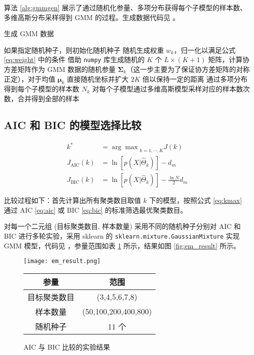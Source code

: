     算法 \ref{alg:gmmgen} 展示了通过随机化参量、多项分布获得每个子模型的样本数、多维高斯分布采样得到 GMM 的过程\cite{gmmgen}。生成数据代码见 。

    \begin{algorithm}
        \caption{生成 GMM 数据}\label{alg:gmmgen}
        如果指定随机种子，则初始化随机种子\;
        随机生成权重 $w_k$，归一化以满足公式 \eqref{eq:weight} 中的条件\;
        借助 \verb"numpy" 库生成随机的 $K$ 个 $L\times (K+1)$ 矩阵，计算协方差矩阵作为 GMM 数据的随机参量 $\bm{\Sigma}_k$（这一步主要为了保证协方差矩阵的对称正定\cite{multinorm}），对于均值 $\bm{\mu}_k$ 直接随机坐标并扩大 $2K$ 倍以保持一定的距离\;
        通过多项分布得到每个子模型的样本数 $N_k$\;
        对每个子模型通过多维高斯模型采样对应的样本数次数，合并得到全部的样本\;
    \end{algorithm}

    \subsection{AIC 和 BIC 的模型选择比较}

    \begin{align}
        k^* &= {\arg\max}_{k=1,\cdots,K}J(k) \label{eq:kmax}\\
        J_\text{AIC}(k) &= \ln[p(X|\hat{\Theta}_k)] - d_m \label{eq:aic}\\
        J_\text{BIC}(k) &= \ln[p(X|\hat{\Theta}_k)] - \frac{\ln N}{2}d_m \label{eq:bic} 
    \end{align}

    比较过程如下：首先计算出所有聚类数目取值 $k$ 下的模型，按照公式 \eqref{eq:kmax} 通过 AIC \eqref{eq:aic} 或 BIC \eqref{eq:bic} 的标准筛选最优聚类数目。

    对每一个二元组 (目标聚类数目, 样本数量) 采用不同的随机种子分别对 AIC 和 BIC 进行多轮实验，采用 sklearn 的 \verb"sklearn.mixture.GaussianMixture" 实现 GMM 模型\cite{skgmm}，代码见 ，参量范围如表 \ref{tab:exparam} 所示，结果如图 \ref{fig:em_result} 所示。

    \begin{figure}
        \begin{minipage}[b]{.5\linewidth}
            \centering
            \texttt{[image: em\_result.png]}
            \caption{AIC 与 BIC 比较的实验结果}\label{fig:em_result}
        \end{minipage}
        \begin{minipage}[b]{.5\linewidth}
            \centering
            \begin{tabular}{cc}
                \toprule
                参量 & 范围 \\
                \midrule
                目标聚类数目 & (3,4,5,6,7,8) \\
                样本数量 & (50,100,200,400,800) \\
                \midrule
                随机种子 & 11 个 \\
                \bottomrule
            \end{tabular}
            \label{tab:exparam}
        \end{minipage}
    \end{figure}

